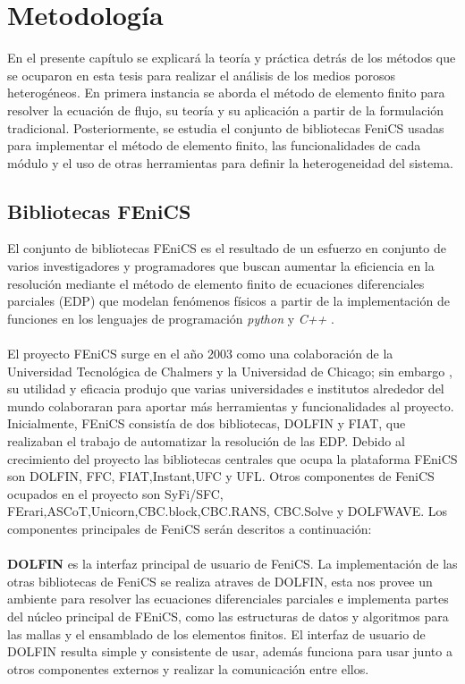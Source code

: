 \chapter{Metodología}
En el presente capítulo se explicará la teoría y práctica detrás de los métodos que se ocuparon en esta tesis para realizar el análisis de los medios porosos heterogéneos. En primera instancia se aborda el método de elemento finito para resolver la ecuación de flujo, su teoría y su aplicación a partir de la formulación tradicional. Posteriormente, se estudia el conjunto de bibliotecas FeniCS usadas para implementar el método de elemento finito, las funcionalidades de cada módulo y el uso de otras herramientas para definir la heterogeneidad del sistema.


\section{Bibliotecas FEniCS}

El conjunto de bibliotecas FEniCS es el resultado de un esfuerzo en conjunto de varios investigadores y programadores que buscan aumentar la eficiencia en la resolución mediante el método de elemento finito de ecuaciones diferenciales parciales (EDP) que modelan fenómenos físicos a partir de la implementación de funciones en los lenguajes de programación \textit{python} y \textit{C++} \cite{Logg2012}.
\\
\\
El proyecto FEniCS surge en el año 2003 como una colaboración de la Universidad Tecnológica de Chalmers y la Universidad de Chicago; sin embargo , su utilidad y eficacia produjo que varias universidades e institutos alrededor del mundo colaboraran para aportar más herramientas y funcionalidades al proyecto. Inicialmente, FEniCS consistía de dos bibliotecas, DOLFIN y FIAT, que realizaban el trabajo de automatizar la resolución de las EDP. Debido al crecimiento del proyecto las bibliotecas centrales que ocupa la plataforma FEniCS son DOLFIN, FFC, FIAT,Instant,UFC y UFL. Otros componentes de FeniCS ocupados en el proyecto son SyFi/SFC, FErari,ASCoT,Unicorn,CBC.block,CBC.RANS, CBC.Solve y DOLFWAVE. Los componentes principales de FeniCS serán descritos a continuación:
\\
\\
\textbf{DOLFIN} es la interfaz principal de usuario de FeniCS. La implementación de las otras bibliotecas de FeniCS se realiza atraves de DOLFIN, esta nos provee un ambiente para resolver las ecuaciones diferenciales parciales e implementa partes del núcleo principal de FEniCS, como las estructuras de datos y algoritmos para las mallas y el ensamblado de los elementos finitos. El interfaz de usuario de DOLFIN resulta simple y consistente de usar, además funciona para usar junto a otros componentes externos y realizar la comunicación entre ellos.


